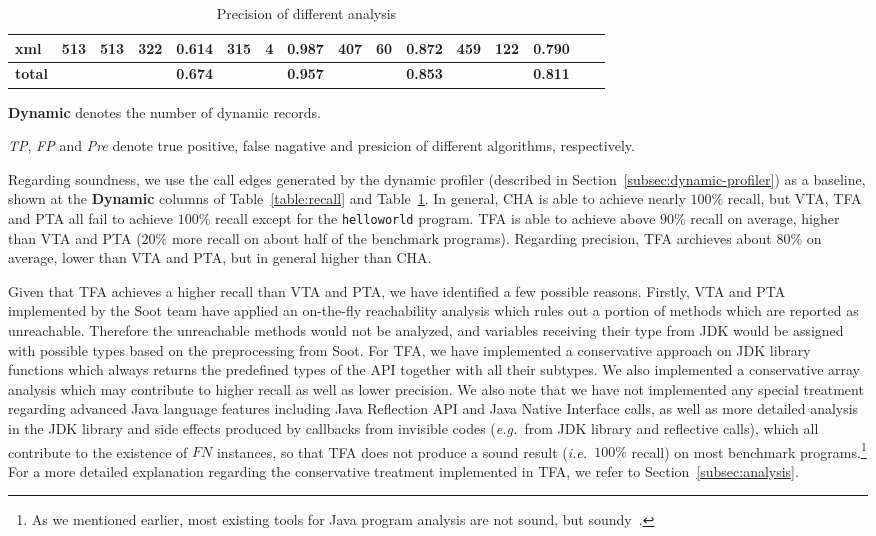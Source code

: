 \documentclass{fac}
\newcommand\eg{\textit{e.g.\ }}
\newcommand\ie{\textit{i.e.\ }}
\begin{document}
\begin{table}
\begin{threeparttable}[b]
\begin{tabular*}{1.0\textwidth}{|l|c|c|c|c|c|c|c|c|c|c|c|c|c|c|c|}
xml & 513 & 513 & 322 & 0.614 & 315 & 4 & 0.987 & 407 & 60 & 0.872 & 459 & 122 & 0.790\\
\hline
\textbf{total} & & & & \textbf{0.674} & & & \textbf{0.957} & & & \textbf{0.853} & & & \textbf{0.811} \\
	\hline
\end{tabular*}
\begin{tablenotes}
  \item[1] \textbf{Dynamic} denotes the number of dynamic records.
  \item[2] \textit{TP}, \textit{FP} and \textit{Pre} denote true positive, false nagative and presicion of different algorithms, respectively.
\end{tablenotes}
\end{threeparttable}
\caption{Precision of different analysis}\label{table:precision}
\end{table}


Regarding soundness, we use the call edges generated by the dynamic profiler (described in Section~\ref{subsec:dynamic-profiler}) as a baseline, shown at the \textbf{Dynamic} columns of Table~\ref{table:recall} and Table~\ref{table:precision}. In general, CHA is able to achieve nearly $100\%$ recall, but VTA, TFA and PTA all fail to achieve $100\%$ recall except for the \texttt{helloworld} program. TFA is able to achieve above $90\%$ recall on average, higher than VTA and PTA ($20\%$ more recall on about half of the benchmark programs). Regarding precision, TFA archieves about $80\%$ on average, lower than VTA and PTA, but in general higher than CHA.

Given that TFA achieves a higher recall than VTA and PTA, we have identified a few possible reasons. Firstly, VTA and PTA implemented by the Soot team have applied an on-the-fly reachability analysis which rules out a portion of methods which are reported as unreachable. Therefore the unreachable methods would not be analyzed, and variables receiving their type from JDK would be assigned with possible types based on the preprocessing from Soot. For TFA, we have implemented a conservative approach on JDK library functions which always returns the predefined types of the API together with all their subtypes. We also implemented a conservative array analysis which may contribute to higher recall as well as lower precision. We also note that we have not implemented any special treatment regarding advanced Java language features including Java Reflection API and Java Native Interface calls, as well as more detailed analysis in the JDK library and side effects produced by callbacks from invisible codes (\eg from JDK library and reflective calls), which all contribute to the existence of $FN$ instances, so that TFA does not produce a sound result (\ie $100\%$ recall) on most benchmark programs.\footnote{As we mentioned earlier, most existing tools for Java program analysis are not sound, but soundy~\cite{LivshitsSSLACGKMV15}.}
For a more detailed explanation regarding the conservative treatment implemented in TFA, we refer to Section~\ref{subsec:analysis}.
\end{document}
